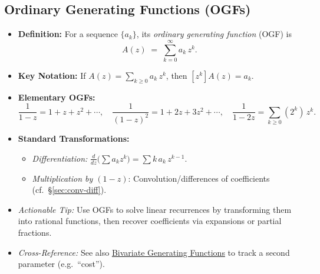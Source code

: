 \documentclass[11pt,letterpaper]{article}
\begin{document}
\subsection{Ordinary Generating Functions (OGFs)}
\begin{itemize}
  \item \textbf{Definition:} For a sequence \(\{a_k\}\), its \emph{ordinary generating function} (OGF) is
    \[
      A(z) \;=\;\sum_{k=0}^{\infty} a_k\,z^k.
    \]
  \item \textbf{Key Notation:} If \(A(z) = \sum_{k\ge0} a_k\,z^k\), then \([z^k]A(z) = a_k\).
  \item \textbf{Elementary OGFs:} 
    \[
      \frac{1}{1-z} = 1+z+z^2+\cdots,\quad
      \frac{1}{(1-z)^2} = 1+2z+3z^2+\cdots,\quad
      \frac{1}{1-2z} = \sum_{k\ge0} (2^k)\,z^k.
    \]
  \item \textbf{Standard Transformations:}
    \begin{itemize}
      \item \textit{Differentiation:} \(\frac{d}{dz}\bigl(\sum a_k z^k\bigr) = \sum k\,a_k\,z^{k-1}\).
      \item \textit{Multiplication by \((1-z)\)}: Convolution/differences of coefficients (cf.\ \S\ref{sec:conv-diff}).
    \end{itemize}
  \item \emph{Actionable Tip:} Use OGFs to solve linear recurrences by transforming them into rational functions, then recover coefficients via expansions or partial fractions.
  \item \emph{Cross-Reference:} See also \hyperref[sec:bivariate]{Bivariate Generating Functions} to track a second parameter (e.g.\ “cost”).
\end{itemize}

\end{document}

